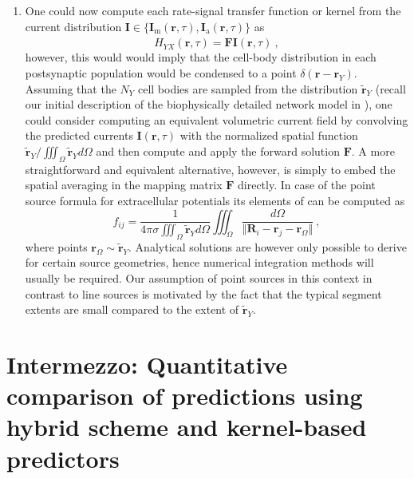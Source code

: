 \begin{enumerate}
\item One could now compute each rate-signal transfer function or kernel from the current distribution
$\mathbf{I} \in \{ \mathbf{I}_\text{m}(\mathbf{r}, \tau), \mathbf{I}_\text{a}(\mathbf{r}, \tau) \}$ as
\begin{equation}
\hat{H}_{YX}(\mathbf{r}, \tau) = \mathbf{F}\mathbf{I}(\mathbf{r}, \tau) ~,
\end{equation}
however, this would would imply that the cell-body distribution in each postsynaptic population would be condensed to a point $\delta(\mathbf{r} - \mathbf{r}_Y)$.
Assuming that the $N_Y$ cell bodies are sampled from the distribution $\widetilde{\mathbf{r}}_Y$
(recall our initial description of the biophysically detailed network model in ),
one could consider computing an equivalent volumetric current field by convolving the predicted currents $\mathbf{I}(\mathbf{r}, \tau)$ with the normalized spatial function
$\widetilde{\mathbf{r}}_Y / \iiint_\Omega \widetilde{\mathbf{r}}_Y d\Omega$
and then compute and apply the forward solution $\mathbf{F}$.
A more straightforward and equivalent alternative, however,
is simply to embed the spatial averaging in the mapping matrix $\mathbf{F}$ directly.
In case of the point source formula for extracellular potentials its elements of can be computed as
\begin{equation}
f_{ij} = \frac{1}{4 \pi \sigma \iiint_\Omega \widetilde{\mathbf{r}}_Y d\Omega}
	\iiint_\Omega \frac{d\Omega}{\Vert \mathbf{R}_i - \mathbf{r}_j - \mathbf{r}_\Omega \Vert}~, 
\end{equation}
where points $\mathbf{r}_\Omega \sim \widetilde{\mathbf{r}}_Y$. 
Analytical solutions are however only possible to derive for certain source geometries, 
hence numerical integration methods will usually be required. 
Our assumption of point sources in this context in contrast to line sources is motivated by the fact that the typical segment extents are small compared to the extent of $\widetilde{\mathbf{r}}_Y$.

\end{enumerate}


\section{Intermezzo: Quantitative comparison of predictions using hybrid scheme and kernel-based predictors}
\label{sec:Schemes:comparison}


